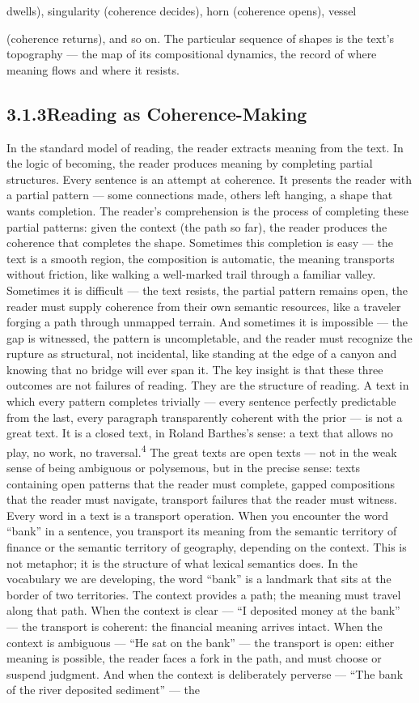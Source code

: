 dwells), singularity (coherence decides), horn (coherence opens), vessel

(coherence returns), and so on. The particular sequence of shapes is the text’s topography — the map of its compositional dynamics, the record of where meaning flows and where it resists.

\subsection{3.1.3\quad Reading as Coherence-Making}

In the standard model of reading, the reader extracts meaning from the text. In the logic of becoming, the reader produces meaning by completing partial structures. Every sentence is an attempt at coherence. It presents the reader with a partial pattern — some connections made, others left hanging, a shape that wants completion. The reader’s comprehension is the process of completing these partial patterns: given the context (the path so far), the reader produces the coherence that completes the shape. Sometimes this completion is easy — the text is a smooth region, the composition is automatic, the meaning transports without friction, like walking a well-marked trail through a familiar valley. Sometimes it is difficult — the text resists, the partial pattern remains open, the reader must supply coherence from their own semantic resources, like a traveler forging a path through unmapped terrain. And sometimes it is impossible — the gap is witnessed, the pattern is uncompletable, and the reader must recognize the rupture as structural, not incidental, like standing at the edge of a canyon and knowing that no bridge will ever span it. The key insight is that these three outcomes are not failures of reading. They are the structure of reading. A text in which every pattern completes trivially — every sentence perfectly predictable from the last, every paragraph transparently coherent with the prior — is not a great text. It is a closed text, in Roland Barthes’s sense: a text that allows no play, no work, no traversal.\textsuperscript{4} The great texts are open texts — not in the weak sense of being ambiguous or polysemous, but in the precise sense: texts containing open patterns that the reader must complete, gapped compositions that the reader must navigate, transport failures that the reader must witness. Every word in a text is a transport operation. When you encounter the word “bank” in a sentence, you transport its meaning from the semantic territory of finance or the semantic territory of geography, depending on the context. This is not metaphor; it is the structure of what lexical semantics does. In the vocabulary we are developing, the word “bank” is a landmark that sits at the border of two territories. The context provides a path; the meaning must travel along that path. When the context is clear — “I deposited money at the bank” — the transport is coherent: the financial meaning arrives intact. When the context is ambiguous — “He sat on the bank” — the transport is open: either meaning is possible, the reader faces a fork in the path, and must choose or suspend judgment. And when the context is deliberately perverse — “The bank of the river deposited sediment” — the 